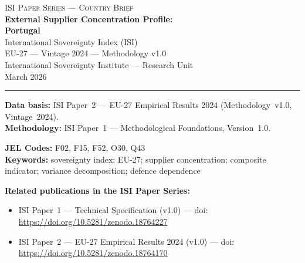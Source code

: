 \documentclass[12pt,a4paper]{article}
\begin{document}
\hypersetup{pageanchor=false}

\begin{titlepage}
\centering
\vspace*{2cm}
{\Large\textsc{ISI Paper Series --- Country Brief}}\\[1.2cm]
{\LARGE\bfseries External Supplier Concentration Profile:\\[0.3em]
Portugal}\\[1.5cm]
{\large International Sovereignty Index (ISI)\\[0.3em]
EU-27 --- Vintage 2024 --- Methodology v1.0}\\[1.2cm]
{\large International Sovereignty Institute --- Research Unit}\\[0.8cm]
{\large March 2026}

\vspace{0.8cm}
\noindent\rule{\textwidth}{0.4pt}
\vspace{0.4cm}

\begin{flushleft}
\noindent\textbf{Data basis:} ISI Paper~2 --- EU-27 Empirical Results 2024 (Methodology~v1.0, Vintage~2024).\\[4pt]
\noindent\textbf{Methodology:} ISI Paper~1 --- Methodological Foundations, Version~1.0.

\medskip

\noindent\textbf{JEL Codes:} F02, F15, F52, O30, Q43\\[4pt]
\noindent\textbf{Keywords:} sovereignty index; EU-27; supplier concentration; composite indicator; variance decomposition; defence dependence

\medskip

\noindent\textbf{Related publications in the ISI Paper Series:}
\begin{itemize}[nosep,leftmargin=1.5em]
\item ISI Paper~1 --- Technical Specification (v1.0) --- doi:\\
  \url{https://doi.org/10.5281/zenodo.18764227}
\item ISI Paper~2 --- EU-27 Empirical Results 2024 (v1.0) --- doi:\\
  \url{https://doi.org/10.5281/zenodo.18764170}
\end{itemize}
\end{flushleft}
\vfill
\end{titlepage}
\end{document}
